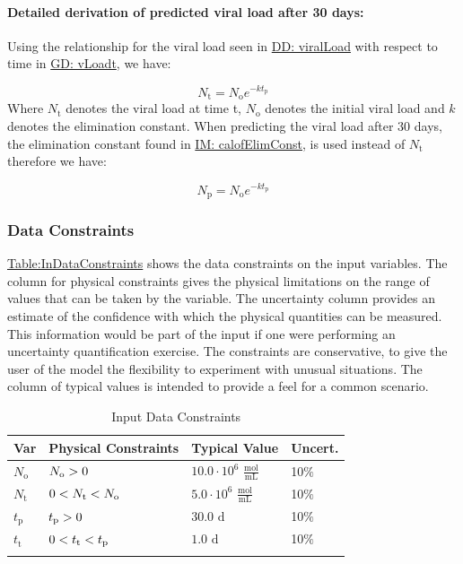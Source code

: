 \documentclass[12pt]{article}
\newcommand{\gt}{\ensuremath >}
\newcommand{\lt}{\ensuremath <}
\begin{document}
\paragraph{Detailed derivation of predicted viral load after 30 days:}
\label{IM:calofPredictedVLDeriv}
Using the relationship for the viral load seen in \hyperref[DD:viralLoad]{DD: viralLoad} with respect to time in \hyperref[GD:vLoadt]{GD: vLoadt}, we have:

\begin{displaymath}
{N_{\text{t}}}={N_{\text{o}}} e^{-k {t_{\text{p}}}}
\end{displaymath}
Where ${N_{\text{t}}}$ denotes the viral load at time t, ${N_{\text{o}}}$ denotes the initial viral load and $k$ denotes the elimination constant. When predicting the viral load after 30 days, the elimination constant  found in \hyperref[IM:calofElimConst]{IM: calofElimConst},  is used instead of ${N_{\text{t}}}$  therefore we have:

\begin{displaymath}
{N_{\text{p}}}={N_{\text{o}}} e^{-k {t_{\text{p}}}}
\end{displaymath}
\subsubsection{Data Constraints}
\label{Sec:DataConstraints}
\hyperref[Table:InDataConstraints]{Table:InDataConstraints} shows the data constraints on the input variables. The column for physical constraints gives the physical limitations on the range of values that can be taken by the variable. The uncertainty column provides an estimate of the confidence with which the physical quantities can be measured. This information would be part of the input if one were performing an uncertainty quantification exercise. The constraints are conservative, to give the user of the model the flexibility to experiment with unusual situations. The column of typical values is intended to provide a feel for a common scenario.

\begin{longtable}{l l l l}
\toprule
\textbf{Var} & \textbf{Physical Constraints} & \textbf{Typical Value} & \textbf{Uncert.}
\\
\midrule
\endhead
${N_{\text{o}}}$ & ${N_{\text{o}}}\gt{}0$ & $10.0\cdot{}10^{6}$ $\frac{\text{mol}}{\text{mL}}$ & 10$\%$
\\
${N_{\text{t}}}$ & $0\lt{}{N_{\text{t}}}\lt{}{N_{\text{o}}}$ & $5.0\cdot{}10^{6}$ $\frac{\text{mol}}{\text{mL}}$ & 10$\%$
\\
${t_{\text{p}}}$ & ${t_{\text{p}}}\gt{}0$ & $30.0$ ${\text{d}}$ & 10$\%$
\\
${t_{\text{t}}}$ & $0\lt{}{t_{\text{t}}}\lt{}{t_{\text{p}}}$ & $1.0$ ${\text{d}}$ & 10$\%$
\\
\bottomrule
\caption{Input Data Constraints}
\label{Table:InDataConstraints}
\end{longtable}
\end{document}
